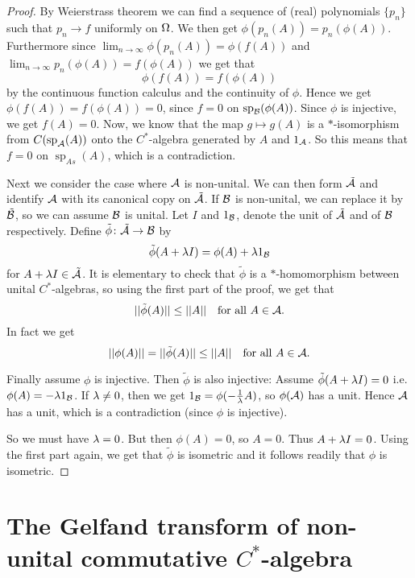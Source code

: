 \documentclass[10pt,english,a4paper]{article}
\theoremstyle{definition}
\DeclareMathOperator{\Sp}{sp}
\begin{document}
\begin{proof}
By Weierstrass theorem we can find a sequence of (real) polynomials $\{p_n\}$
such that $p_n \to f$ uniformly on $\Omega$. We then get $\phi(p_n(A)) = p_n(\phi(A))$. Furthermore 
since $\lim_{n\to\infty} \phi(p_n(A)) = \phi(f(A))$ and $\lim_{n \to \infty}
p_n(\phi(A)) = f(\phi(A))$ we get that \[\phi(f(A)) = f(\phi(A))\] by the
continuous function calculus and the continuity of $\phi$.
Hence we get $\phi(f(A)) = f(\phi(A)) = 0$, since $f = 0$ on $\Sp_{\Bs}(\phi(A))$. 
Since $\phi$ is injective, we get $f(A) = 0$. Now, we know that the map $g \mapsto g(A)$
is a $*$-isomorphism from $C(\Sp_{\As}(A))$ onto the $C^*$-algebra generated 
by $A$ and $1_{\mathcal{A}}$. So this means that $f=0$ on $\Sp_{As}(A)$, which is a contradiction. 

Next we consider the case where $\mathcal{A}$ is non-unital. 
We can then form $\tilde{\mathcal{A}}$ and identify $\mathcal{A}$ with its canonical copy on $\tilde{\mathcal{A}}$.
If $\mathcal{B}$ is non-unital, we can replace it by $\tilde{\mathcal{B}}$, so we can assume $\mathcal{B}$ is 
unital. Let $I$ and $1_{\mathcal{B}}$, denote the unit of $\tilde{\mathcal{A}}$ and of $\mathcal{B}$ 
respectively. Define $\tilde{\phi}\colon \tilde{\mathcal{A}} \to \mathcal{B}$ by 
\[ \tilde{\phi}(A + \lambda I) = \phi(A) + \lambda 1_{\mathcal{B}} \]
for $A + \lambda I \in \tilde{\mathcal{A}}$. It is elementary to check that 
$\tilde{\phi}$ is a $*$-homomorphism between unital $C^*$-algebras, so using 
the first part of the proof, we get that 
\[ ||\tilde{\phi}(A) || \leq ||A|| \quad \text{for all } A \in \mathcal{A}.\]
In fact we get 
\[ ||\phi(A)|| = ||\tilde{\phi}(A)|| \leq||A|| \quad \text{for all }A \in \mathcal{A}. \]

Finally assume $\phi$ is injective. Then $\tilde{\phi}$ is also injective:
Assume $\tilde{\phi}(A + \lambda I) = 0$ i.e. $\phi(A) = - \lambda 1_{\mathcal{B}}$.
If $\lambda \neq 0$, then we get $1_{\mathcal{B}} = \phi(-\tfrac{1}{\lambda}A)$, so $\phi(\mathcal{A})$
has a unit. Hence $\mathcal{A}$ has a unit, which is a contradiction (since $\phi$ is injective).

So we must have $\lambda =0$. But then $\phi(A) = 0$, so $A = 0$. Thus $A+ \lambda I = 0$. 
Using the first part again, we get that $\tilde{\phi}$ is isometric and it follows readily 
that $\phi$ is isometric. 


\end{proof}

\section{The Gelfand transform of non-unital commutative $C^*$-algebra}
\end{document}

